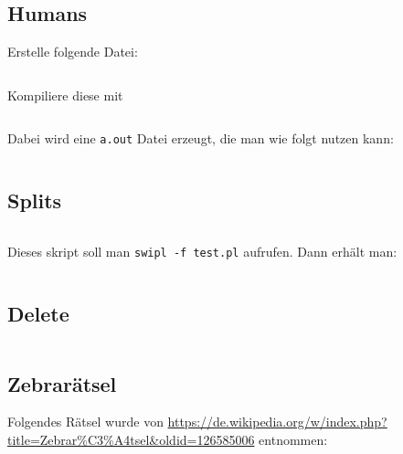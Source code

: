 \subsection{Humans}
Erstelle folgende Datei:
\inputminted[linenos, numbersep=5pt, tabsize=4, frame=lines, label=human.pro]{prolog}{scripts/prolog/human.pro}

Kompiliere diese mit
\inputminted[numbersep=5pt, tabsize=4]{bash}{scripts/prolog/human.sh}

Dabei wird eine \texttt{a.out} Datei erzeugt, die man wie folgt
nutzen kann:
\inputminted[numbersep=5pt, tabsize=4]{bash}{scripts/prolog/human-2.sh}

\subsection{Splits}
\inputminted[linenos, numbersep=5pt, tabsize=4, frame=lines, label=splits.pl]{prolog}{scripts/prolog/splits.pl}

Dieses skript soll man \texttt{swipl -f test.pl} aufrufen. Dann erhält man:

\inputminted[numbersep=5pt, tabsize=4]{prolog}{scripts/prolog/splits.sh}

\subsection{Delete}
\inputminted[numbersep=5pt, tabsize=4]{prolog}{scripts/prolog/delete.pl}

\subsection{Zebrarätsel}
Folgendes Rätsel wurde von \url{https://de.wikipedia.org/w/index.php?title=Zebrar%C3%A4tsel&oldid=126585006}
entnommen:

